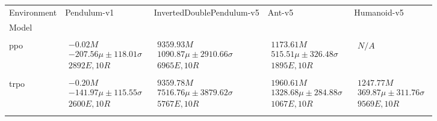 \begin{tabular}{|l|p{6cm}|p{6cm}|p{6cm}|p{6cm}|}
\toprule
Environment & Pendulum-v1 & InvertedDoublePendulum-v5 & Ant-v5 & Humanoid-v5 \\
Model &  &  &  &  \\
\midrule \\ \hline
ppo & $\begin{array}{c} -0.02M \\ -207.56\mu \pm 118.01\sigma \\ 2892E, 10R \end{array}$ & $\begin{array}{c} 9359.93M \\ 1090.87\mu \pm 2910.66\sigma \\ 6965E, 10R \end{array}$ & $\begin{array}{c} 1173.61M \\ 515.51\mu \pm 326.48\sigma \\ 1895E, 10R \end{array}$ & $\begin{array}{c} N/A \end{array}$ \\ \\ \hline
trpo & $\begin{array}{c} -0.20M \\ -141.97\mu \pm 115.55\sigma \\ 2600E, 10R \end{array}$ & $\begin{array}{c} 9359.78M \\ 7516.76\mu \pm 3879.62\sigma \\ 5767E, 10R \end{array}$ & $\begin{array}{c} 1960.61M \\ 1328.68\mu \pm 284.88\sigma \\ 1067E, 10R \end{array}$ & $\begin{array}{c} 1247.77M \\ 369.87\mu \pm 311.76\sigma \\ 9569E, 10R \end{array}$ \\ \\ \hline

\end{tabular}

